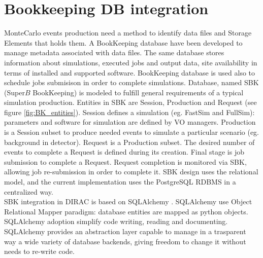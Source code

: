 \documentclass[a4paper]{jpconf}
\begin{document}
\section{Bookkeeping DB integration}
\label{sec:db}
MonteCarlo events production need a method to identify data files and Storage Elements
that holds them. A BookKeeping database have been developed to manage metadata associated with
data files. The same database stores information about simulations, executed jobs and output data, site availability
in terms of installed and supported software.
BookKeeping database is used also to schedule jobs submisison in order to complete simulations.
Database, named SBK (Super$B$ BookKeeping) is modeled to fulfill general requirements of a typical simulation production.
Entities in SBK are Session, Production and Request (see figure \ref{fig:BK_entities}). Session defines a simulation (eg. FastSim and FullSim): parameters and software for simulation are defined by VO managers. Production is a Session subset to produce needed events to simulate a particular scenario (eg. background in detector).
Request is a Production subset. The desired number of events to complete a Request is defined during its creation.
Final stage is job submission to complete a Request. Request completion is monitored via SBK, allowing job re-submission in order to complete it. SBK design uses the relational model, and the current implementation uses the PostgreSQL RDBMS in 
a centralized way.\\
SBK integration in DIRAC is based on SQLAlchemy \cite{ref:sqlalchemy}. SQLAlchemy use Object Relational Mapper paradigm: database entities are mapped as python objects. SQLAlchemy adoption simplify code writing, reading and documenting. SQLAlchemy provides an abstraction layer capable to manage in a trasparent way a wide variety of database backends, giving freedom to change it without needs to re-write code.
\end{document}
